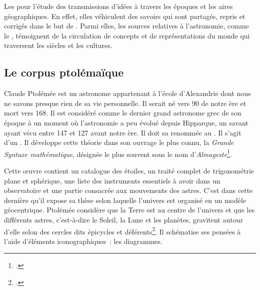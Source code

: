 Les  pour l'étude des transmissions d'idées à travers les époques et les aires géographiques.
En effet, elles véhiculent des savoirs qui sont partagés, repris et corrigés dans le but de .
Parmi elles, les sources relatives à l'astronomie, comme le , témoignent de la circulation de concepts et de représentations du monde qui traversent les siècles et les cultures.

\subsection{Le corpus ptolémaïque}


Claude Ptolémée est un astronome appartenant à l'école d'Alexandrie dont nous ne savons presque rien de sa vie personnelle.
Il serait né vers 90 de notre ère et mort vers 168.
Il est considéré comme le dernier grand astronome grec de son époque à un moment où l'astronomie a peu évolué depuis Hipparque, un savant ayant vécu entre 147 et 127 avant notre ère.
Il doit sa renommée au .
Il s'agit d'un .
Il développe cette théorie dans son ouvrage le plus connu, la \textit{Grande Syntaxe mathématique}, désignée le plus souvent sous le nom d'\textit{Almageste}\footcite{verdetLaubeLastronomieLaurore1990}.


Cette œuvre contient un catalogue des étoiles, un traité complet de trigonométrie plane et sphérique, une liste des instruments essentiels à avoir dans un observatoire et une partie consacrée aux mouvements des astres.
C'est dans cette dernière qu'il expose sa thèse selon laquelle l'univers est organisé en un modèle géocentrique.
Ptolémée considère que la Terre est au centre de l'univers et que les différents astres, c'est-à-dire le Soleil, la Lune et les planètes, gravitent autour d'elle selon des cercles dits épicycles et déférents\footcite{costabelCLAUDEPTOLEMEE90}.
Il schématise ses pensées à l'aide d'éléments iconographiques~: les diagrammes.

